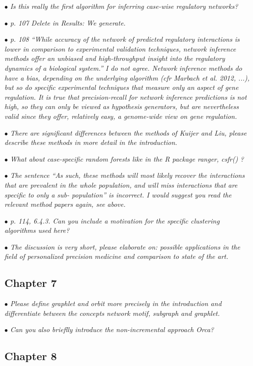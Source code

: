 \documentclass[10pt]{article}
\newcommand{\exam}[2][\  ]{\hspace{0pt}\marginpar{\color{red}#1}$\bullet$ \textit{#2}}
\newcommand{\imp}[1]{{\color{red} #1}}
\newcommand{\nimp}[1]{{\color{gray} #1}}
\newcommand{\bigexclaim}{\raisebox{-0.1em}{\BigTriangleUp}\hspace{-0.32em}\llap{\small\textbf{!}}\hspace{0.32em}}
\newcommand{\tagimp}{\bigexclaim}
\newcommand{\tagtime}{{\Large $\hourglass$}}
\begin{document}
{{\exam{Is this really the first algorithm for inferring case-wise regulatory networks?}

\exam[\tagimp]{p. 107 Delete in Results: We generate.}

\exam{\nimp{p. 108 “While accuracy of the network of predicted regulatory interactions is lower in
	comparison to experimental validation techniques, network inference methods offer an
	unbiased and high-throughput insight into the regulatory dynamics of a biological system.”} I
	do not agree. Network inference methods do have a bias, depending on the underlying
	algorithm (cfr Marbach et al. 2012, ...), but so do specific experimental techniques that
	measure only an aspect of gene regulation. It is true that precision-recall for network
	inference predictions is not high, so they can only be viewed as hypothesis generators, but
	are nevertheless valid since they offer, relatively easy, a genome-wide view on gene
	regulation.}

\exam{There are significant differences between the methods of Kuijer and Liu, please describe
	these methods in more detail in the introduction.}

\exam{What about case-specific random forests like in the R package ranger, csfr() ?}
 

\exam[\tagimp]{The sentence “As such, these methods will most likely recover the interactions that are
	prevalent in the whole population, and will miss interactions that are specific to only a sub-
	population” is incorrect. \imp{I would suggest you read the relevant method papers again, see
	above.}}


\exam{p. 114, 6.4.3. Can you include a motivation for the specific clustering algorithms used here?}


\exam[\tagimp \tagtime]{\imp{The discussion is very short, please elaborate on}: possible applications in the field of
	personalized precision medicine and comparison to state of the art.}


\subsection{Chapter 7}

\exam{Please define graphlet and orbit more precisely in the introduction and differentiate between
	the concepts network motif, subgraph and graphlet.}

\exam{Can you also brieflly introduce the non-incremental approach Orca?}

\subsection{Chapter 8}

}}
\end{document}
